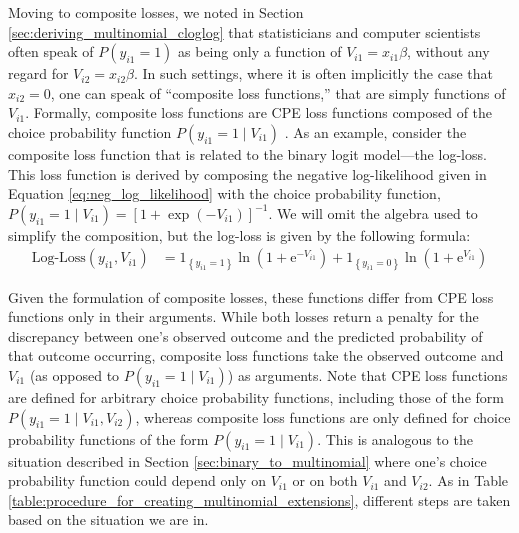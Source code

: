 Moving to composite losses, we noted in Section \ref{sec:deriving_multinomial_cloglog} that statisticians and computer scientists often speak of $P \left( y_{i1} = 1 \right)$ as being only a function of $V_{i1} = x_{i1} \beta$, without any regard for $V_{i2} = x_{i2} \beta$. In such settings, where it is often implicitly the case that $x_{i2} = 0$, one can speak of ``composite loss functions,'' that are simply functions of $V_{i1}$. Formally, composite loss functions are CPE loss functions composed of the choice probability function $P \left( y_{i1} = 1 \mid V_{i1} \right)$ \citep{reid_composite_2010}. As an example, consider the composite loss function that is related to the binary logit model---the log-loss. This loss function is derived by composing the negative log-likelihood given in Equation \ref{eq:neg_log_likelihood} with the choice probability function, $P \left( y_{i1} = 1 \mid V_{i1} \right) = \left[ 1 + \exp \left( -V_{i1} \right) \right]^{-1}$. We will omit the algebra used to simplify the composition, but the log-loss is given by the following formula:
\begin{equation}
\label{eq:log_loss}
\begin{aligned}
\textrm{Log-Loss}\left(y_{i1},  V_{i1} \right) &= 1_{\left\lbrace y_{i1} = 1 \right\rbrace} \ln \left(1 + \mathrm{e}^{-V_{i1}} \right) + 1_{\left\lbrace y_{i1} = 0 \right\rbrace} \ln \left(1 + \mathrm{e}^{ V_{i1} } \right)
\end{aligned}
\end{equation}

Given the formulation of composite losses, these functions differ from CPE loss functions only in their arguments. While both losses return a penalty for the discrepancy between one's observed outcome and the predicted probability of that outcome occurring, composite loss functions take the observed outcome and  $V_{i1}$ (as opposed to $P \left( y_{i1} = 1 \mid V_{i1} \right)$) as arguments. Note that CPE loss functions are defined for arbitrary choice probability functions, including those of the form $P \left( y_{i1} = 1 \mid V_{i1}, V_{i2} \right)$, whereas composite loss functions are only defined for choice probability functions of the form $P \left( y_{i1} = 1 \mid V_{i1} \right)$. This is analogous to the situation described in Section \ref{sec:binary_to_multinomial} where one's choice probability function could depend only on $V_{i1}$ or on both  $V_{i1}$ and  $V_{i2}$. As in Table \ref{table:procedure_for_creating_multinomial_extensions}, different steps are taken based on the situation we are in.

